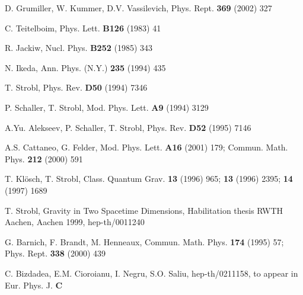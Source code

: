 \documentclass[a4paper,12pt]{article}
\begin{document}
\begin{thebibliography}{99}
  D. Grumiller, W. Kummer, D.V. Vassilevich, Phys. Rept.
\textbf{369} (2002) 327

  C. Teitelboim, Phys. Lett. \textbf{B126} (1983) 41

  R. Jackiw, Nucl. Phys. \textbf{B252} (1985) 343

  N. Ikeda, Ann. Phys. (N.Y.) \textbf{235} (1994) 435

  T. Strobl, Phys. Rev. \textbf{D50} (1994) 7346

  P. Schaller, T. Strobl, Mod. Phys. Lett. \textbf{A9} (1994)
3129

  A.Yu. Alekseev, P. Schaller, T. Strobl, Phys. Rev. \textbf{%
D52} (1995) 7146

  A.S. Cattaneo, G. Felder, Mod. Phys. Lett. \textbf{A16}
(2001) 179; Commun. Math. Phys. \textbf{212} (2000) 591

  T. Kl\"{o}sch, T. Strobl, Class. Quantum Grav. \textbf{13}
(1996) 965; \textbf{13} (1996) 2395; \textbf{14} (1997) 1689

  T. Strobl, Gravity in Two Spacetime Dimensions, Habilitation
thesis RWTH Aachen, Aachen 1999, hep-th/0011240

  G. Barnich, F. Brandt, M. Henneaux, Commun. Math. Phys.
\textbf{174} (1995) 57; Phys. Rept. \textbf{338} (2000) 439

  C. Bizdadea, E.M. Cioroianu, I. Negru, S.O. Saliu,
hep-th/0211158, to appear in Eur. Phys. J. \textbf{C}
\end{thebibliography}
\end{document}
